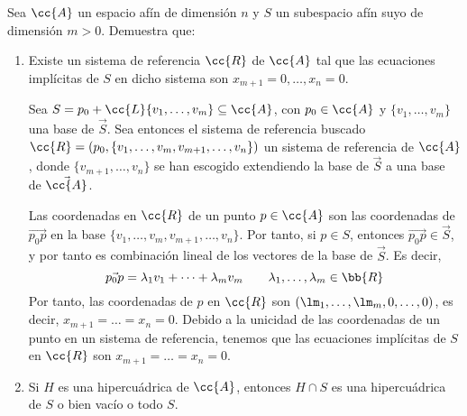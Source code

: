 \begin{ejercicio}\label{ej:5.3.3}
    Sea $\cc{A}$ un espacio afín de dimensión $n$ y $S$ un subespacio afín suyo de dimensión $m > 0$. Demuestra que:
    \begin{enumerate}
        \item Existe un sistema de referencia $\cc{R}$ de $\cc{A}$ tal que las ecuaciones implícitas de $S$ en dicho sistema son $x_{m+1} = 0, \dots , x_n = 0$.
        
        Sea $S=p_0+\cc{L}\{v_1,\dots,v_m\} \subseteq \cc{A}$, con $p_0\in \cc{A}$ y $\{v_1,\dots,v_m\}$ una base de $\vec{S}$.
        Sea entonces el sistema de referencia buscado $\cc{R}=(p_0,\{v_1,\dots,v_m, v_{m+1},\dots, v_n\})$ un sistema de referencia de $\cc{A}$, donde $\{v_{m+1},\dots,v_n\}$ se han escogido extendiendo la base de $\vec{S}$ a una base de $\vec{\cc{A}}$.
        
        Las coordenadas en $\cc{R}$ de un punto $p\in \cc{A}$ son las coordenadas de $\vec{p_0p}$ en la base $\{v_1,\dots,v_m, v_{m+1},\dots, v_n\}$.
        Por tanto, si $p\in S$, entonces $\vec{p_0p}\in \vec{S}$, y por tanto es combinación lineal de los vectores de la base de $\vec{S}$. Es decir,
        \begin{equation*}
            \vec{p_0p}=\lambda_1v_1+\dots+\lambda_mv_m \qquad \lambda_1,\dots,\lambda_m\in \bb{R}
        \end{equation*}
        Por tanto, las coordenadas de $p$ en $\cc{R}$ son $(\lm_1, \dots, \lm_m, 0, \dots, 0)$, es decir, $x_{m+1}=\dots=x_n=0$.
        Debido a la unicidad de las coordenadas de un punto en un sistema de referencia, tenemos que las ecuaciones implícitas de $S$ en $\cc{R}$ son $x_{m+1}=\dots=x_n=0$.

        \item \label{item:5.3.3.b} Si $H$ es una hipercuádrica de $\cc{A}$, entonces $H \cap S$ es una hipercuádrica de $S$ o bien vacío o todo $S$.
        
    \end{enumerate}
\end{ejercicio}



